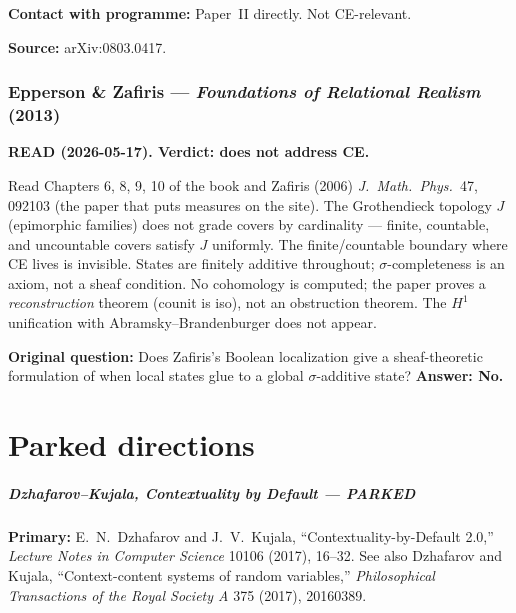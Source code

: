 \medskip\noindent
\textbf{Contact with programme:} Paper~II directly.  Not
CE-relevant.

\medskip\noindent
\textbf{Source:} arXiv:0803.0417.

\section{Epperson \& Zafiris --- \emph{Foundations of Relational
Realism} (2013)}

\textbf{READ (2026-05-17).  Verdict: does not address CE.}

\medskip\noindent
Read Chapters 6, 8, 9, 10 of the book and Zafiris (2006)
\emph{J.\ Math.\ Phys.}\ 47, 092103 (the paper that puts measures
on the site).  The Grothendieck topology $J$ (epimorphic families)
does not grade covers by cardinality --- finite, countable, and
uncountable covers satisfy $J$ uniformly.  The finite/countable
boundary where CE lives is invisible.  States are finitely additive
throughout; $\sigma$-completeness is an axiom, not a sheaf
condition.  No cohomology is computed; the paper proves a
\emph{reconstruction} theorem (counit is iso), not an obstruction
theorem.  The $H^1$ unification with Abramsky--Brandenburger does
not appear.

\medskip\noindent
\textbf{Original question:} Does Zafiris's Boolean localization
give a sheaf-theoretic formulation of when local states glue to a
global $\sigma$-additive state?  \textbf{Answer: No.}


\appendix
\part{Parked directions}

\subsubsection*{Dzhafarov--Kujala, Contextuality by Default --- PARKED}

\noindent\textbf{Primary:} E.~N.~Dzhafarov and J.~V.~Kujala,
``Contextuality-by-Default 2.0,'' \emph{Lecture Notes in Computer
Science} 10106 (2017), 16--32.  See also Dzhafarov and Kujala,
``Context-content systems of random variables,'' \emph{Philosophical
Transactions of the Royal Society A} 375 (2017), 20160389.

